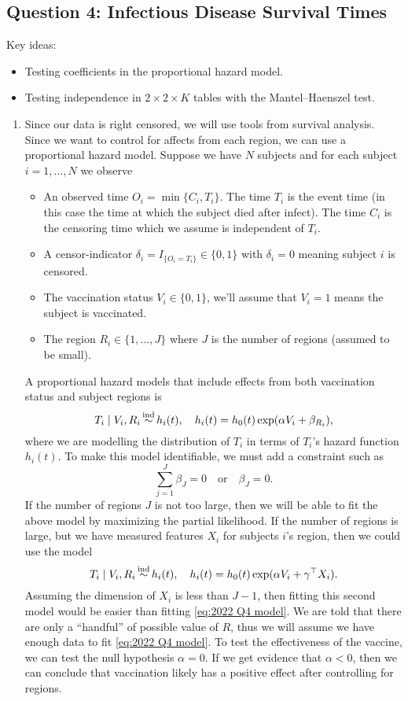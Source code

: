 \subsection*{Question 4: Infectious Disease Survival Times}
Key ideas:
\begin{itemize}
    \item Testing coefficients in the proportional hazard model.
    \item Testing independence in $2 \times 2 \times K$ tables with the Mantel--Haenszel test.
\end{itemize}
\begin{enumerate}[label=(\alph*)]
    \item Since our data is right censored, we will use tools from survival analysis.  Since we want to control for affects from each region, we can use a proportional hazard model. Suppose we have $N$ subjects and for each subject $i=1,\ldots,N$ we observe 
    \begin{itemize}
        \item An observed time $O_i = \min\{C_i,T_i\}$. The time $T_i$ is the event time (in this case the time at which the subject died after infect). The time $C_i$ is the censoring time which we assume is independent of $T_i$.
        \item A censor-indicator $\delta_i= I_{\{O_i = T_i\}} \in \{0,1\}$ with $\delta_i=0$ meaning subject $i$ is censored.
        \item The vaccination status $V_i \in \{0,1\}$, we'll assume that $V_i=1$ means the subject is vaccinated.
        \item The region $R_i \in \{1,\ldots,J\}$ where $J$ is the number of regions (assumed to be small).
    \end{itemize}
    A proportional hazard models that include effects from both vaccination status and subject regions is
    \begin{equation}\label{eq:2022 Q4 model}T_i\mid V_i,R_i \simind h_i(t), \quad h_i(t) = h_0(t)\exp(\alpha V_i + \beta_{R_i}), \end{equation}
    where we are modelling the distribution of $T_i$ in terms of $T_i$'s hazard function $h_i(t)$. To make this model identifiable, we must add a constraint such as
    \[\sum_{j=1}^J \beta_J = 0 \quad \text{or} \quad \beta_J = 0. \]
    If the number of regions $J$ is not too large, then we will be able to fit the above model by maximizing the partial likelihood. If the number of regions is large, but we have measured features $X_i$ for subjects $i$'s region, then we could use the model
    \[T_i \mid V_i,R_i \simind h_i(t), \quad h_i(t)=h_0(t)\exp(\alpha V_i + \gamma^\top X_i). \]
    Assuming the dimension of $X_i$ is less than $J-1$, then fitting this second model would be easier than fitting \eqref{eq:2022 Q4 model}. We are told that there are only a ``handful'' of possible value of $R$, thus we will assume we have enough data to fit \eqref{eq:2022 Q4 model}. To test the effectiveness of the vaccine, we can test the null hypothesis $\alpha = 0$. If we get evidence that $\alpha <0$, then we can conclude that vaccination likely has a positive effect after controlling for regions. 


\end{enumerate}
